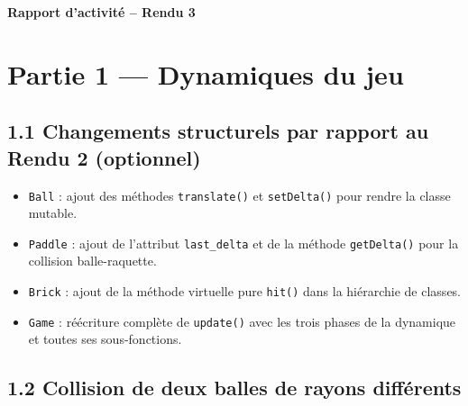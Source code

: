\documentclass[10pt,a4paper]{article}
\begin{document}
\begin{center}
    {\huge \textbf{Rapport d'activit\'e -- Rendu 3}}
\end{center}
\vspace{0.1cm}

\section*{Partie 1 — Dynamiques du jeu}

\subsection*{1.1 Changements structurels par rapport au Rendu 2 (optionnel)}


\begin{itemize}[noitemsep, topsep=2pt]
    \item \texttt{Ball} : ajout des méthodes \texttt{translate()} et
      \texttt{setDelta()} pour rendre la classe mutable.
    \item \texttt{Paddle} : ajout de l'attribut \texttt{last\_delta}
      et de la méthode \texttt{getDelta()} pour la collision
      balle-raquette.
    \item \texttt{Brick} : ajout de la méthode virtuelle pure
      \texttt{hit()} dans la hiérarchie de classes.
    \item \texttt{Game} : réécriture complète de \texttt{update()}
      avec les trois phases de la dynamique et toutes ses sous-fonctions.
\end{itemize}

\subsection*{1.2 Collision de deux balles de rayons diff\'{e}rents}
\end{document}
